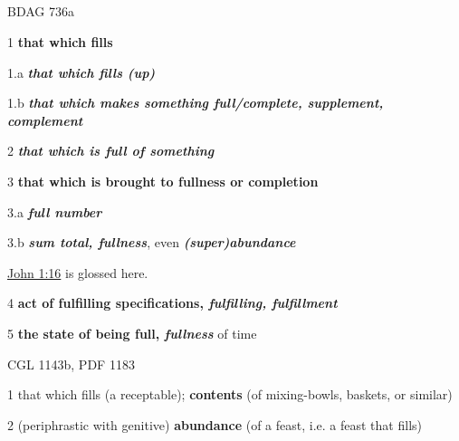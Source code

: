 				
		
			\subparagraph{\texorpdfstring{}{}}
				\label{PLEROMA}
			
				\begin{compactdesc}
					\item[BDAG 736a] \textbf{}
						\begin{compactitem}
							\item[1] \textbf{that which fills}
							\item[1.a] \textbf{\textit{that which fills (up)}}
							\item[1.b] \textbf{\textit{that which makes something full/complete, supplement, complement}}
							\item[2] \textbf{\textit{that which is full of something}}
							\item[3] \textbf{that which is brought to fullness or completion}
							\item[3.a] \textbf{\textit{full number}}
							\item[3.b] \textbf{\textit{sum total, fullness}}, even \textbf{\textit{(super)abundance}}
								\begin{compactitem}
									\item \hyperref[JOHN-1-16]{John 1:16} is glossed here.
								\end{compactitem}
							\item[4] \textbf{act of fulfilling specifications, \textit{fulfilling, fulfillment}}
							\item[5] \textbf{the state of being full, \textit{fullness}} of time
						\end{compactitem}
					\item[CGL 1143b, PDF 1183] \textbf{}
						\begin{compactitem}
							\item[1] that which fills (a receptable); \textbf{contents} (of mixing-bowls, baskets, or similar)
							\item[2] (periphrastic with genitive) \textbf{abundance} (of a feast, i.e. a feast that fills)

\end{compactitem}
\end{compactdesc}
